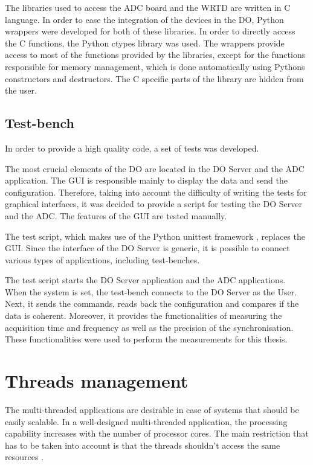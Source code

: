         The libraries used to access the ADC board and the WRTD are written in C language. In order to ease the integration of the devices in the DO, Python wrappers were developed for both of these libraries. In order to directly access the C functions, the Python ctypes \cite{ctypes} library was used. The wrappers provide access to most of the functions provided by the libraries, except for the functions responsible for memory management, which is done automatically using Pythons constructors and destructors. The C specific parts of the library are hidden from the user.

    \subsection{Test-bench} \label{section:do_testbench_app}
        In order to provide a high quality code, a set of tests was developed.
        
        The most crucial elements of the DO are located in the DO Server and the ADC application. The GUI is responsible mainly to display the data and send the configuration. Therefore, taking into account the difficulty of writing the tests for graphical interfaces, it was decided to provide a script for testing the DO Server and the ADC. The features of the GUI are tested manually.
        
        The test script, which makes use of the Python unittest framework \cite{python_unittest}, replaces the GUI. Since the interface of the DO Server is generic, it is possible to connect various types of applications, including test-benches.
        
        The test script starts the DO Server application and the ADC applications. When the system is set, the test-bench connects to the DO Server as the User. Next, it sends the commands, reads back the configuration and compares if the data is coherent. Moreover, it provides the functionalities of measuring the acquisition time and frequency as well as the precision of the synchronisation. These functionalities were used to perform the measurements for this thesis.

\section{Threads management} \label{section:threads_management}
    The multi-threaded applications are desirable in case of systems that should be easily scalable. In a well-designed multi-threaded application, the processing capability increases with the number of processor cores. The main restriction that has to be taken into account is that the threads shouldn't access the same resources \cite{zeromq_guide}.
    
